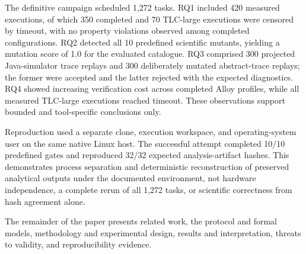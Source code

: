 The definitive campaign scheduled 1,272 tasks. RQ1 included 420 measured
executions, of which 350 completed and 70 TLC-large executions were censored by
timeout, with no property violations observed among completed configurations.
RQ2 detected all 10 predefined scientific mutants, yielding a mutation score of
1.0 for the evaluated catalogue. RQ3 comprised 300 projected Java-simulator trace replays and 300
deliberately mutated abstract-trace replays; the former were accepted
and the latter rejected with the expected diagnostics. RQ4 showed increasing
verification cost across completed Alloy profiles, while all measured
TLC-large executions reached timeout. These observations support bounded and
tool-specific conclusions only.

Reproduction used a separate clone, execution workspace, and operating-system
user on the same native Linux host. The successful attempt completed 10/10
predefined gates and reproduced 32/32 expected analysis-artifact hashes. This
demonstrates process separation and deterministic reconstruction of preserved
analytical outputs under the documented environment, not hardware independence,
a complete rerun of all 1,272 tasks, or scientific correctness from hash
agreement alone.

The remainder of the paper presents related work, the protocol and formal
models, methodology and experimental design, results and interpretation,
threats to validity, and reproducibility evidence.
